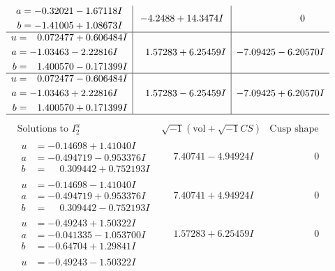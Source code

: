 \documentclass[1p]{elsarticle_modified}
\theoremstyle{definition}
\newcommand{\I}{\sqrt{-1}}
\begin{document}
$$\begin{array}{c|c|c}
\begin{aligned}
a &= -0.32021 - 1.67118 I \\
b &= -1.41005 + 1.08673 I\end{aligned}
 & -4.2488 + 14.3474 I & \phantom{-0.000000 } 0 \\ \hline\begin{aligned}
u &= \phantom{-}0.072477 + 0.606484 I \\
a &= -1.03463 - 2.22816 I \\
b &= \phantom{-}1.400570 - 0.171399 I\end{aligned}
 & \phantom{-}1.57283 + 6.25459 I & -7.09425 - 6.20570 I \\ \hline\begin{aligned}
u &= \phantom{-}0.072477 - 0.606484 I \\
a &= -1.03463 + 2.22816 I \\
b &= \phantom{-}1.400570 + 0.171399 I\end{aligned}
 & \phantom{-}1.57283 - 6.25459 I & -7.09425 + 6.20570 I\\
 \hline 
 \end{array}$$\newpage$$\begin{array}{c|c|c}  
\text{Solutions to }I^u_{2}& \I (\text{vol} + \sqrt{-1}CS) & \text{Cusp shape}\\
 \hline 
\begin{aligned}
u &= -0.14698 + 1.41040 I \\
a &= -0.494719 - 0.953376 I \\
b &= \phantom{-}0.309442 + 0.752193 I\end{aligned}
 & \phantom{-}7.40741 - 4.94924 I & \phantom{-0.000000 } 0 \\ \hline\begin{aligned}
u &= -0.14698 - 1.41040 I \\
a &= -0.494719 + 0.953376 I \\
b &= \phantom{-}0.309442 - 0.752193 I\end{aligned}
 & \phantom{-}7.40741 + 4.94924 I & \phantom{-0.000000 } 0 \\ \hline\begin{aligned}
u &= -0.49243 + 1.50322 I \\
a &= -0.041335 - 1.053700 I \\
b &= -0.64704 + 1.29841 I\end{aligned}
 & \phantom{-}1.57283 + 6.25459 I & \phantom{-0.000000 } 0 \\ \hline\begin{aligned}
u &= -0.49243 - 1.50322 I \\

\end{aligned}
\end{array}$$
\end{document}
